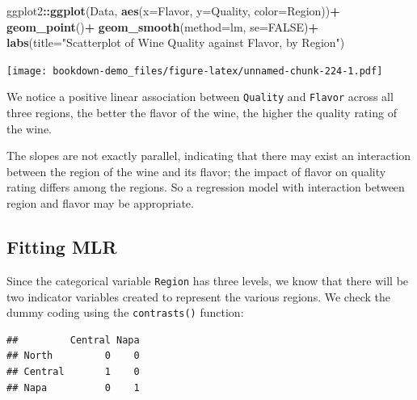 \documentclass[
]{book}
\newenvironment{Shaded}{\begin{snugshade}}{\end{snugshade}}
\newcommand{\AttributeTok}[1]{\textcolor[rgb]{0.13,0.29,0.53}{#1}}
\newcommand{\ConstantTok}[1]{\textcolor[rgb]{0.56,0.35,0.01}{#1}}
\newcommand{\DocumentationTok}[1]{\textcolor[rgb]{0.56,0.35,0.01}{\textbf{\textit{#1}}}}
\newcommand{\FunctionTok}[1]{\textcolor[rgb]{0.13,0.29,0.53}{\textbf{#1}}}
\newcommand{\NormalTok}[1]{#1}
\newcommand{\SpecialCharTok}[1]{\textcolor[rgb]{0.81,0.36,0.00}{\textbf{#1}}}
\newcommand{\StringTok}[1]{\textcolor[rgb]{0.31,0.60,0.02}{#1}}
\begin{document}
\begin{Shaded}
\begin{Highlighting}[]
\NormalTok{ggplot2}\SpecialCharTok{::}\FunctionTok{ggplot}\NormalTok{(Data, }\FunctionTok{aes}\NormalTok{(}\AttributeTok{x=}\NormalTok{Flavor, }\AttributeTok{y=}\NormalTok{Quality, }\AttributeTok{color=}\NormalTok{Region))}\SpecialCharTok{+}
  \FunctionTok{geom\_point}\NormalTok{()}\SpecialCharTok{+}
  \FunctionTok{geom\_smooth}\NormalTok{(}\AttributeTok{method=}\NormalTok{lm, }\AttributeTok{se=}\ConstantTok{FALSE}\NormalTok{)}\SpecialCharTok{+}
  \FunctionTok{labs}\NormalTok{(}\AttributeTok{title=}\StringTok{"Scatterplot of Wine Quality against Flavor, by Region"}\NormalTok{)}
\end{Highlighting}
\end{Shaded}

\texttt{[image: bookdown-demo\_files/figure-latex/unnamed-chunk-224-1.pdf]}

We notice a positive linear association between \texttt{Quality} and \texttt{Flavor} across all three regions, the better the flavor of the wine, the higher the quality rating of the wine.

The slopes are not exactly parallel, indicating that there may exist an interaction between the region of the wine and its flavor; the impact of flavor on quality rating differs among the regions. So a regression model with interaction between region and flavor may be appropriate.

\hypertarget{fitting-mlr}{%
\subsection*{Fitting MLR}\label{fitting-mlr}}

Since the categorical variable \texttt{Region} has three levels, we know that there will be two indicator variables created to represent the various regions. We check the dummy coding using the \texttt{contrasts()} function:

\begin{Shaded}
\end{Shaded}

\begin{verbatim}
##         Central Napa
## North         0    0
## Central       1    0
## Napa          0    1
\end{verbatim}
\end{document}
